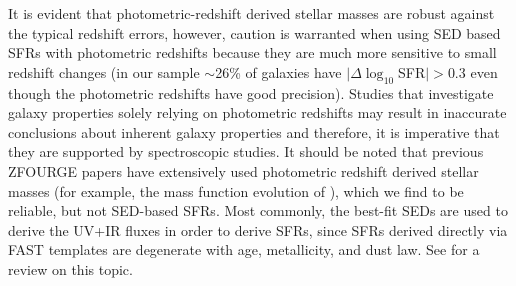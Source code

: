 \documentclass[iop]{emulateapj}
\newcommand{\around}{$\sim$}
\begin{document}
It is evident that photometric-redshift derived stellar masses are robust against the typical redshift errors, however, caution is warranted when using SED based SFRs with
photometric redshifts because they are much more sensitive to small redshift changes 
 (in our sample \around26\% of galaxies have $|\Delta\log_{10}$SFR$|>0.3$ even though the photometric redshifts have good precision). 
Studies that investigate galaxy properties solely relying on photometric redshifts may result in inaccurate conclusions about inherent galaxy properties and therefore, it is imperative that  they are supported by spectroscopic studies. It should be noted that previous ZFOURGE papers have extensively used photometric redshift derived stellar masses (for example, the mass function evolution of \citet{Tomczak2014}), which we find to be reliable, but not SED-based SFRs. Most commonly, the best-fit SEDs are used to derive the UV+IR fluxes in order to derive SFRs, since SFRs derived directly via FAST templates \cite[eg.,][]{Maraston2010} are degenerate with age, metallicity, and dust law. See \citet{Conroy2013} for a review on this topic. 
\end{document}
